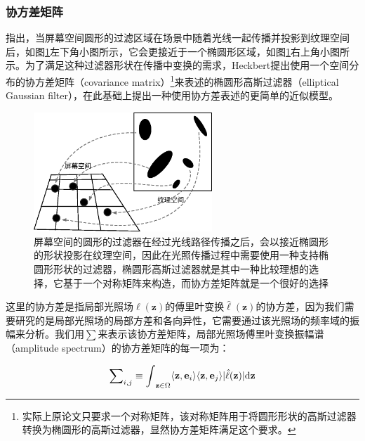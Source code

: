 \subsubsection{协方差矩阵}
\cite{a:FundamentalsofTextureMappingandImageWarping}指出，当屏幕空间圆形的过滤区域在场景中随着光线一起传播并投影到纹理空间后，如图\ref{f:pt-elliptical-filter}左下角小图所示，它会更接近于一个椭圆形区域，如图\ref{f:pt-elliptical-filter}右上角小图所示。为了满足这种过滤器形状在传播中变换的需求，Heckbert提出使用一个空间分布的协方差矩阵（covariance matrix）\footnote{实际上原论文只要求一个对称矩阵，该对称矩阵用于将圆形形状的高斯过滤器转换为椭圆形的高斯过滤器，显然协方差矩阵满足这个要求。}来表述的椭圆形高斯过滤器（elliptical Gaussian filter），\cite{a:5DCovarianceTracingforEfficientDefocusandMotionBlur}在此基础上提出一种使用协方差表述的更简单的近似模型。

\begin{figure}
	\sidecaption
	\includegraphics[width=0.6\textwidth]{figures/pt/elliptical-filter}
	\caption{屏幕空间的圆形的过滤器在经过光线路径传播之后，会以接近椭圆形的形状投影在纹理空间，因此在光照传播过程中需要使用一种支持椭圆形形状的过滤器，椭圆形高斯过滤器就是其中一种比较理想的选择，它基于一个对称矩阵来构造，而协方差矩阵就是一个很好的选择}
	\label{f:pt-elliptical-filter}
\end{figure}

这里的协方差是指局部光照场$\ell(\mathbf{z})$的傅里叶变换$\hat{\ell}(\mathbf{z})$的协方差，因为我们需要研究的是局部光照场的局部方差和各向异性，它需要通过该光照场的频率域的振幅来分析。我们用$\sum$来表示该协方差矩阵，局部光照场傅里叶变换振幅谱（amplitude spectrum）的协方差矩阵的每一项为：

\begin{equation}
	\sum\nolimits_{i,j}\equiv{\rm \int\limits}_{\mathbf{z}\in\Omega}\langle\mathbf{z},\mathbf{e}_i\rangle\langle\mathbf{z},\mathbf{e}_j\rangle |\hat{\ell}(\mathbf{z})|{\rm d}\mathbf{z}
\end{equation}

